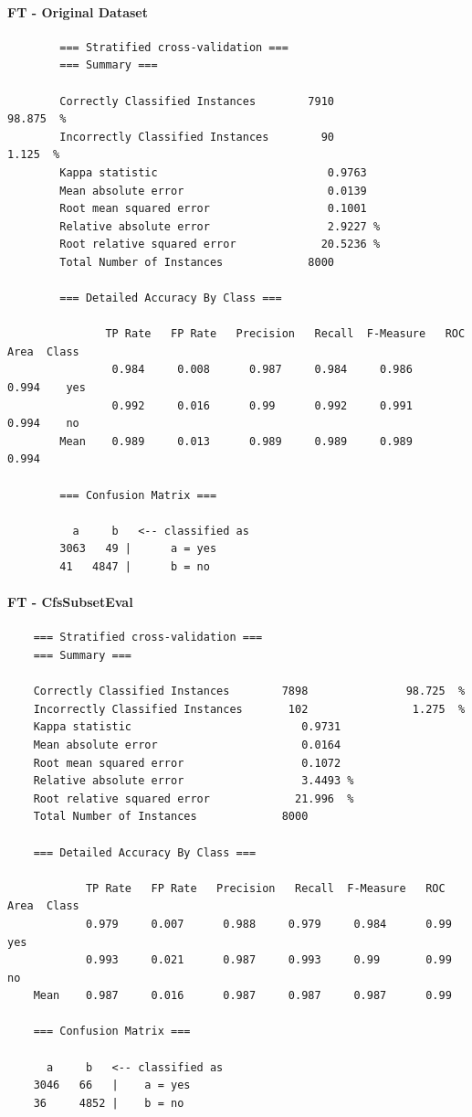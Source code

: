 \paragraph{FT - Original Dataset}
{\scriptsize
	\begin{verbatim}
		=== Stratified cross-validation ===
		=== Summary ===
		
		Correctly Classified Instances        7910               98.875  %
		Incorrectly Classified Instances        90                1.125  %
		Kappa statistic                          0.9763
		Mean absolute error                      0.0139
		Root mean squared error                  0.1001
		Relative absolute error                  2.9227 %
		Root relative squared error             20.5236 %
		Total Number of Instances             8000     
		
		=== Detailed Accuracy By Class ===
		
		       TP Rate   FP Rate   Precision   Recall  F-Measure   ROC Area  Class
		        0.984     0.008      0.987     0.984     0.986      0.994    yes
		        0.992     0.016      0.99      0.992     0.991      0.994    no
		Mean    0.989     0.013      0.989     0.989     0.989      0.994
		
		=== Confusion Matrix ===
		
		  a     b   <-- classified as
		3063   49 |      a = yes
		41   4847 |      b = no
	\end{verbatim}
}

\paragraph{FT - CfsSubsetEval}
{\scriptsize
	\begin{verbatim}
	=== Stratified cross-validation ===
	=== Summary ===
	
	Correctly Classified Instances        7898               98.725  %
	Incorrectly Classified Instances       102                1.275  %
	Kappa statistic                          0.9731
	Mean absolute error                      0.0164
	Root mean squared error                  0.1072
	Relative absolute error                  3.4493 %
	Root relative squared error             21.996  %
	Total Number of Instances             8000     
	
	=== Detailed Accuracy By Class ===
	
	        TP Rate   FP Rate   Precision   Recall  F-Measure   ROC Area  Class
	        0.979     0.007      0.988     0.979     0.984      0.99     yes
	        0.993     0.021      0.987     0.993     0.99       0.99     no
	Mean    0.987     0.016      0.987     0.987     0.987      0.99 
	
	=== Confusion Matrix ===
	
	  a     b   <-- classified as
	3046   66   |    a = yes
	36     4852 |    b = no
	\end{verbatim}
}

